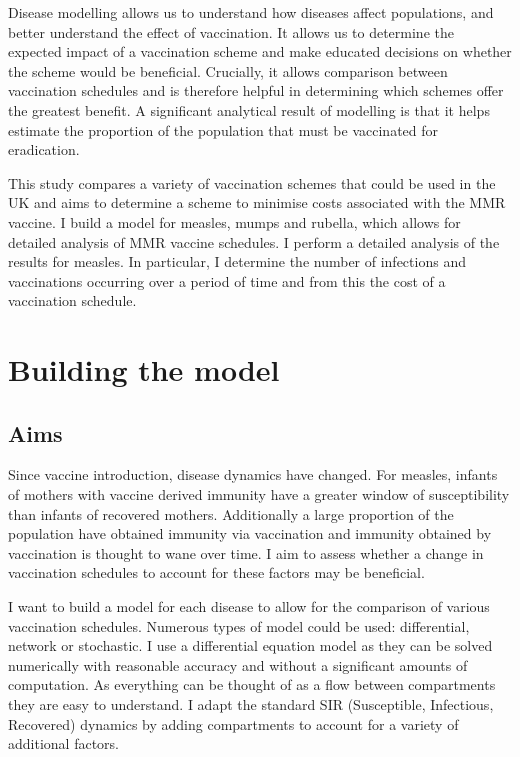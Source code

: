 \documentclass[a4paper,11pt] {scrartcl}
\begin{document}
Disease modelling allows us to understand how diseases affect populations, and better understand the effect of vaccination. It allows us to determine the expected impact of a vaccination scheme and make educated decisions on whether the scheme would be beneficial. Crucially, it allows comparison between vaccination schedules and is therefore helpful in determining which schemes offer the greatest benefit. A significant analytical result of modelling is that it helps estimate the proportion of the population that must be vaccinated for eradication\cite{mclean2005mathematical}.

This study compares a variety of vaccination schemes that could be used in the UK and aims to determine a scheme to minimise costs associated with the MMR vaccine. I build a model for measles, mumps and rubella, which allows for detailed analysis of MMR vaccine schedules. I perform a detailed analysis of the results for measles. In particular, I determine the number of infections and vaccinations occurring over a period of time and from this the cost of a vaccination schedule.

\newpage
\section{Building the model}
\label{sec:buildmodel}
\subsection{Aims}
\label{subsec:buildmodelaims}
Since vaccine introduction, disease dynamics have changed. For measles, infants of mothers with vaccine derived immunity have a greater window of susceptibility than infants of recovered mothers. Additionally a large proportion of the population have obtained immunity via vaccination and immunity obtained by vaccination is thought to wane over time\cite{lebaron2007measlespersistence,lebaron2009rubellapersistence,lebaron2009mumpspersistence,davidkin2008persistence}. I aim to assess whether a change in vaccination schedules to account for these factors may be beneficial.

I want to build a model for each disease to allow for the comparison of various vaccination schedules. Numerous types of model could be used: differential, network or stochastic. I use a differential equation model as they can be solved numerically with reasonable accuracy and without a significant amounts of computation. As everything can be thought of as a flow between compartments they are easy to understand. I adapt the standard SIR (Susceptible, Infectious, Recovered) dynamics by adding compartments to account for a variety of additional factors.
\end{document}
